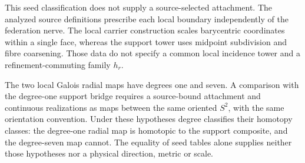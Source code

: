 This seed classification does not supply a source-selected attachment.
The analyzed source definitions prescribe each local boundary independently
of the federation nerve. The local carrier construction scales barycentric
coordinates within a single face, whereas the support tower uses midpoint
subdivision and fibre coarsening. Those data do not specify a common local
incidence tower and a refinement-commuting family \(h_r\).

The two local Galois radial maps have degrees one and seven. A comparison
with the degree-one support bridge requires a source-bound attachment and
continuous realizations as maps between the same oriented \(S^2\), with
the same orientation convention. Under these hypotheses degree classifies
their homotopy classes: the degree-one radial map is homotopic to the
support composite, and the degree-seven map cannot. The equality of seed
tables alone supplies neither those hypotheses nor a physical direction,
metric or scale.

